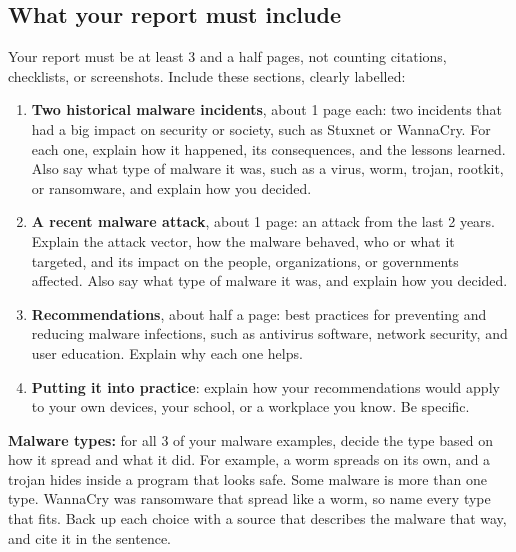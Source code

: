 \documentclass[12pt]{article}
\begin{document}
\subsection*{What your report must include}
Your report must be at least 3 and a half pages, not counting citations, checklists, or screenshots. Include these sections, clearly labelled:
\begin{enumerate}
    \item \textbf{Two historical malware incidents}, about 1 page each: two incidents that had a big impact on security or society, such as Stuxnet or WannaCry. For each one, explain how it happened, its consequences, and the lessons learned. Also say what type of malware it was, such as a virus, worm, trojan, rootkit, or ransomware, and explain how you decided.
    \item \textbf{A recent malware attack}, about 1 page: an attack from the last 2 years. Explain the attack vector, how the malware behaved, who or what it targeted, and its impact on the people, organizations, or governments affected. Also say what type of malware it was, and explain how you decided.
    \item \textbf{Recommendations}, about half a page: best practices for preventing and reducing malware infections, such as antivirus software, network security, and user education. Explain why each one helps.
    \item \textbf{Putting it into practice}: explain how your recommendations would apply to your own devices, your school, or a workplace you know. Be specific.
\end{enumerate}

\textbf{Malware types:} for all 3 of your malware examples, decide the type based on how it spread and what it did. For example, a worm spreads on its own, and a trojan hides inside a program that looks safe. Some malware is more than one type. WannaCry was ransomware that spread like a worm, so name every type that fits. Back up each choice with a source that describes the malware that way, and cite it in the sentence.
\end{document}

